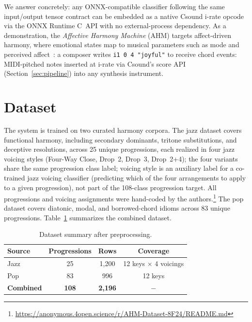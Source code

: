 \documentclass[runningheads,a4paper]{llncs}
\begin{document}
We answer concretely: any ONNX-compatible classifier following the same
input/output tensor contract can be embedded as a native Csound i-rate opcode
via the ONNX Runtime C~API with no external-process dependency.
As a demonstration, the \emph{Affective Harmony Machine} (AHM) targets
affect-driven harmony, where emotional states map to musical parameters such as
mode and perceived affect~\cite{hevner1935}: a composer writes \texttt{i1~0~4~"joyful"}
to receive chord events: MIDI-pitched notes inserted at i-rate via
Csound's score API (Section~\ref{sec:pipeline}) into any synthesis instrument.


\section{Dataset}

The system is trained on two curated harmony corpora. The jazz dataset covers
functional harmony, including secondary dominants, tritone substitutions, and
deceptive resolutions, across 25 unique progressions, each realized in four jazz
voicing styles (Four-Way Close, Drop~2, Drop~3, Drop~2+4); the four variants
share the same progression class label; voicing style is an auxiliary label
for a co-trained jazz voicing classifier (predicting which of the four
arrangements to apply to a given progression), not part of the 108-class
progression target. All progressions
and voicing assignments were hand-coded by the authors.\footnote{\url{https://anonymous.4open.science/r/AHM-Dataset-8F24/README.md}} The pop dataset covers
diatonic, modal, and borrowed-chord idioms across 83 unique progressions.
Table~\ref{tab:dataset} summarizes the combined dataset.

\begin{table}[t]
\caption{Dataset summary after preprocessing.}
\label{tab:dataset}
\centering
\begin{tabular}{lccc}
\hline
Source & Progressions & Rows & Coverage \\
\hline
Jazz      & 25 & 1{,}200 & 12 keys $\times$ 4 voicings \\
Pop       & 83 &   996   & 12 keys \\
\textbf{Combined} & \textbf{108} & \textbf{2{,}196} & $-$ \\
\hline
\end{tabular}
\end{table}
\end{document}
